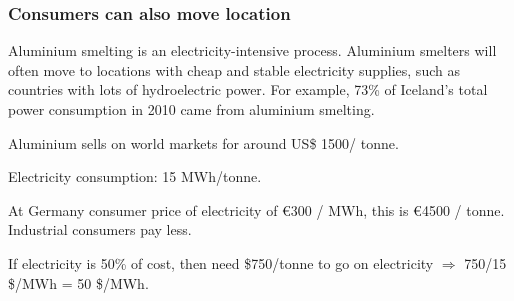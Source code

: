 \documentclass[10pt,aspectratio=169,dvipsnames]{beamer}
\begin{document}
\begin{frame}
  \frametitle{Consumers can also move location}

  Aluminium smelting is an electricity-intensive process. Aluminium
  smelters will often move to locations with cheap and stable
  electricity supplies, such as countries with lots of hydroelectric
  power.  For example, 73\% of Iceland's total power consumption in
  2010 came from aluminium smelting.

  Aluminium sells on world markets for around US\$ 1500/ tonne. %

  Electricity consumption: 15 MWh/tonne.

  At Germany consumer price of electricity of \euro 300 / MWh, this is \euro 4500 / tonne. Industrial consumers pay less.

  If electricity is 50\% of cost, then need \$750/tonne to go on electricity $\Rightarrow$ 750/15 \$/MWh = 50 \$/MWh.













  \end{frame}
\end{document}
